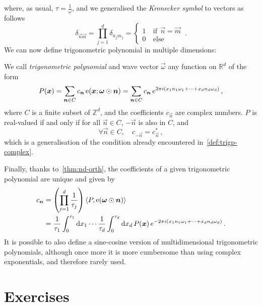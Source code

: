 where, as usual, $\tau=\frac{1}{\omega}$, and we generalised the \emph{Kronecker symbol}
to vectors as follows
\begin{equation}
  \delta_{\vec{n}\vec{m}}=\prod_{j=1}^{d}\delta_{n_jm_j}=
  \begin{cases}
    1&~\mathrm{if}~~\vec{n}=\vec{m}\\
    0&~\mathrm{else}
  \end{cases}\,.
\end{equation}
We can now define trigonometric polynomial in multiple dimensions:
\begin{definition}
  We call \emph{trigonometric polynomial} and wave vector $\vec{\omega}$ any function on
  $\mathbb{R}^d$ of the form
  \begin{equation}
    P(\bm{x})=\sum_{\bm{n}\in C}c_{\bm{n}}\operatorname{e}(\bm{x};\bm{\omega}\odot\bm{n})
    =\sum_{\bm{n}\in C}c_{\bm{n}}\,e^{2\pi i(x_1n_1\omega_1+\cdots+x_dn_d\omega_d)}\,,
  \end{equation}
  where $C$ is a finite subset of $\mathbb{Z}^d$, and the coefficients $c_{\vec{n}}$ are
  complex numbers. $P$ is real-valued if and only if for all $\vec{n}\in C$, $-\vec{n}$ is
  also in $C$, and
  \begin{equation}
    \forall\vec{n}\in C,\quad c_{-\vec{n}}=c_{\vec{n}}^*\,,
  \end{equation}
  which is a generalisation of the condition already encountered
  in~\cref{def:trigp-complex}.
\end{definition}
Finally, thanks to~\cref{thm:nd-orth}, the coefficients of a given trigonometric
polynomial are unique and given by
\begin{align}
  c_{\bm{n}}&=\left(\prod_{j=1}^{d}\frac{1}{\tau_j}\right)
  \braket{P,\operatorname{e}(\bm{\omega}\odot\bm{n})}\notag\\
  &=
  \frac{1}{\tau_1}\int_0^{\tau_1}\mathrm{d} x_1\cdots\frac{1}{\tau_d}\int_0^{\tau_d}\mathrm{d} x_d\,
  P(\bm{x})\,e^{-2\pi i(x_1n_1\omega_1+\cdots+x_dn_d\omega_d)}\,.
\end{align}
It is possible to also define a sine-cosine version of multidimensional trigonometric
polynomials, although once more it is more cumbersome than using complex exponentials, and
therefore rarely used.
\pagebreak
\section{Exercises}
